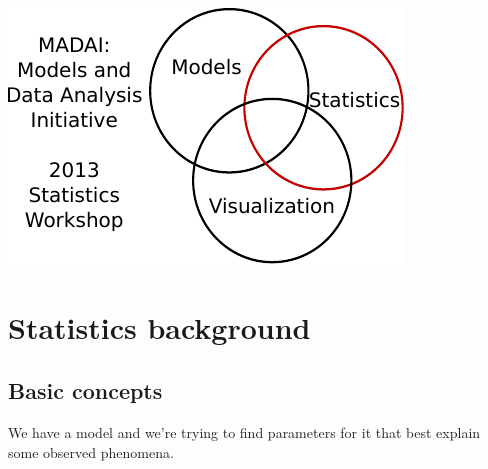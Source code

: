 \documentclass{article}
\begin{document}
\begin{center}
\includegraphics{figures/MADAI_2013_Stats_Workshop.pdf}
\end{center}

\section{Statistics background}

\subsection{Basic concepts}

We have a model and we're trying to find parameters for it that best
explain some observed phenomena.
\end{document}
